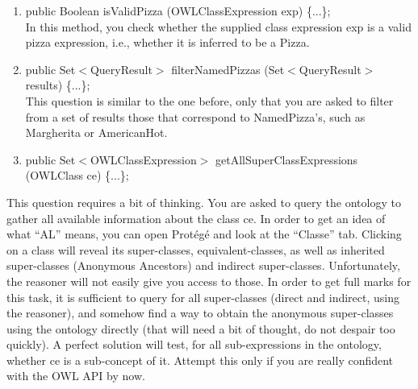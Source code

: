 \documentclass[12pt,a4paper]{article}
\newenvironment{problem}[2][{\color{red}Question}]{\begin{trivlist}
\item[\hskip \labelsep {\bfseries #1}\hskip \labelsep {\bfseries #2.}]}{\end{trivlist}}
\begin{document}
\begin{problem}{{\color{red}5}}
\begin{enumerate}
\item {\textsf{public Boolean isValidPizza (OWLClassExpression exp) \{...\};}}\\
In this method, you check whether the supplied class expression exp is a valid pizza expression, i.e., whether it is inferred to be a Pizza.
\item {\textsf{public Set$<$QueryResult$>$ filterNamedPizzas (Set$<$QueryResult$>$ results) \{...\};}}\\
This question is similar to the one before, only that you are asked to filter from a set of results those that correspond to NamedPizza's, such as Margherita or AmericanHot.
\item {\textsf{public Set$<$OWLClassExpression$>$ getAllSuperClassExpressions (OWLClass ce) \{...\};}}\\
\end{enumerate}
This question requires a bit of thinking. You are asked to query the ontology to gather all available information about the class \textsf{ce}. In order to get an idea of what ``AL'' means, you can open Prot\'eg\'e and look at the ``Classe'' tab. Clicking on a class will reveal its super-classes, equivalent-classes, as well as inherited super-classes (Anonymous Ancestors) and indirect super-classes. Unfortunately, the reasoner will not easily give you access to those. In order to get full marks for this task, it is sufficient to query for all super-classes (direct and indirect, using the reasoner), and somehow find a way to obtain the anonymous super-classes using the ontology directly (that will need a bit of thought, do not despair too quickly). A perfect solution will test, for all sub-expressions in the ontology, whether \textsf{ce} is a sub-concept of it. Attempt this only if you are really confident with the OWL API by now.

\end{problem}
\end{document}
